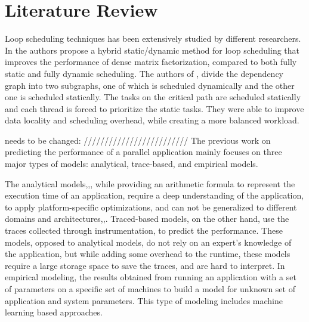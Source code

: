 \section{Literature Review}

Loop scheduling techniques has been extensively studied by different researchers. In \cite{donfack2012hybrid} the authors propose a hybrid static/dynamic method for loop scheduling that improves the performance of dense matrix factorization, compared to both fully static and fully dynamic scheduling. The authors of \cite{donfack2012hybrid}, divide the dependency graph into two subgraphs, one of which is scheduled dynamically and the other one is scheduled statically. The tasks on the critical path are scheduled statically and each thread is forced to prioritize the static tasks\cite{donfack2012hybrid}. They were able to improve data locality and scheduling overhead, while creating a more balanced workload. 

%	
needs to be changed:
/////////////////////////
The previous work on predicting the performance of a parallel application mainly focuses on three major types of models: analytical, trace-based, and empirical models\cite{malakar2018benchmarking}. 

The analytical models\cite{blagojevic2008modeling},\cite{kerbyson2001predictive},\cite{valiant1990bridging}, while providing an arithmetic formula to represent the execution time of an application, require a deep understanding of the application, to apply platform-specific optimizations, and can not be generalized to different domains and architectures\cite{lee2007methods},\cite{sun2017automated},\cite{pllana2007performance}.
Traced-based models, on the other hand, use the traces collected through instrumentation, to predict the performance. These models, opposed to analytical models, do not rely on an expert's knowledge of the application, but while adding some overhead to the runtime, these models require a large storage space to save the traces, and are hard to interpret\cite{sun2017automated}.   
In empirical modeling, the results obtained from running an application with a set of parameters on a specific set of machines to build a model for unknown set of application and system parameters\cite{malakar2018benchmarking}. This type of modeling includes machine learning based approaches.

